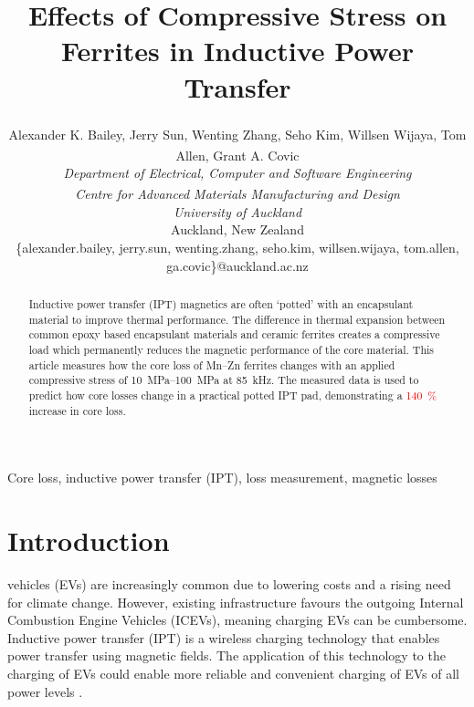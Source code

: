 \documentclass[conference]{IEEEtran}
\begin{document}
\title{Effects of Compressive Stress on Ferrites in Inductive Power Transfer}

\author{
  Alexander K. Bailey, Jerry Sun\textsuperscript{\textdagger}, Wenting Zhang, Seho Kim, Willsen Wijaya\textsuperscript{\textdagger}, Tom Allen\textsuperscript{\textdagger}, Grant A. Covic\\
  \textit{Department of Electrical, Computer and Software Engineering}\\
  \textit{\textsuperscript{\textdagger}Centre for Advanced Materials Manufacturing and Design}\\
  \textit{University of Auckland}\\
  Auckland, New Zealand\\
  \{alexander.bailey, jerry.sun, wenting.zhang, seho.kim, willsen.wijaya, tom.allen, ga.covic\}@auckland.ac.nz\\ 
}
\maketitle

\begin{abstract}
  Inductive power transfer (IPT) magnetics are often `potted' with an encapsulant material to improve thermal performance.
  The difference in thermal expansion between common epoxy based encapsulant materials and ceramic ferrites creates a compressive load which permanently reduces the magnetic performance of the core material. 
  This article measures how the core loss of Mn--Zn ferrites changes with an applied compressive stress of \SIrange{10}{100}{\mega\pascal} at \SI{85}{\kilo\hertz}. 
  The measured data is used to predict how core losses change in a practical potted IPT pad, demonstrating a \textcolor{red}{\SI{140}{\percent}} increase in core loss. 
\end{abstract}

\begin{IEEEkeywords}
Core loss, inductive power transfer (IPT), loss measurement, magnetic losses
\end{IEEEkeywords}

\section{Introduction}

 vehicles (EVs) are increasingly common due to lowering costs and a rising need for climate change. 
However, existing infrastructure favours the outgoing Internal Combustion Engine Vehicles (ICEVs), meaning charging EVs can be cumbersome. 
Inductive power transfer (IPT) is a wireless charging technology that enables power transfer using magnetic fields. 
The application of this technology to the charging of EVs could enable more reliable and convenient charging of EVs of all power levels \cite{covicModernTrendsInductive2013b}. 
\end{document}
